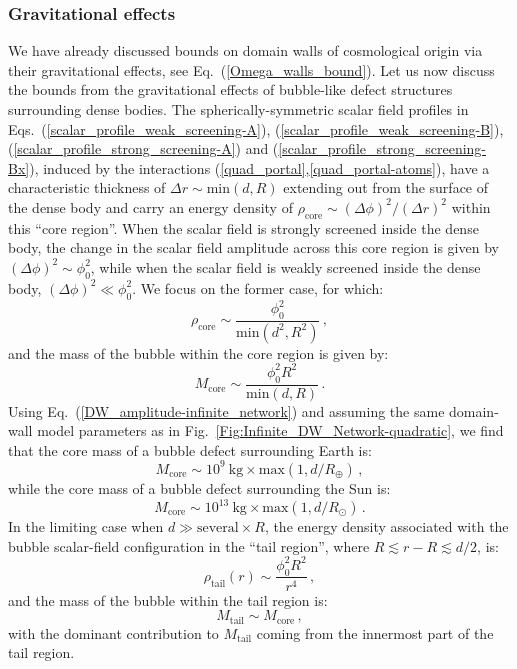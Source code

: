 \documentclass[aps,prd,onecolumn,nofootinbib]{revtex4-2} %
\begin{document}
\subsubsection{Gravitational effects}
\label{Sec:Main_Grav-effects}
We have already discussed bounds on domain walls of cosmological origin via their gravitational effects, see Eq.~(\ref{Omega_walls_bound}). 
Let us now discuss the bounds from the gravitational effects of bubble-like defect structures surrounding dense bodies. 
The spherically-symmetric scalar field profiles in Eqs.~(\ref{scalar_profile_weak_screening-A}), (\ref{scalar_profile_weak_screening-B}), (\ref{scalar_profile_strong_screening-A}) and (\ref{scalar_profile_strong_screening-Bx}), induced by the interactions (\ref{quad_portal},\ref{quad_portal-atoms}), have a characteristic thickness of $\Delta r \sim \textrm{min}(d,R)$ extending out from the surface of the dense body and carry an energy density of $\rho_\textrm{core} \sim (\Delta \phi)^2 / (\Delta r)^2$ within this ``core region''. 
When the scalar field is strongly screened inside the dense body, the change in the scalar field amplitude across this core region is given by $(\Delta \phi)^2 \sim \phi_0^2$, while when the scalar field is weakly screened inside the dense body, $(\Delta \phi)^2 \ll \phi_0^2$. 
We focus on the former case, for which: 
\begin{equation}
\label{energy-density_core}
\rho_\textrm{core} \sim \frac{\phi_0^2}{\textrm{min} (d^2 , R^2)}  \, , 
\end{equation}
and the mass of the bubble within the core region is given by: 
\begin{equation}
\label{mass_bubble_core}
M_\textrm{core} \sim \frac{\phi_0^2 R^2}{\textrm{min} (d , R)}  \, . 
\end{equation}
Using Eq.~(\ref{DW_amplitude-infinite_network}) and assuming the same domain-wall model parameters as in Fig.~\ref{Fig:Infinite_DW_Network-quadratic}, we find that the core mass of a bubble defect surrounding Earth is: 
\begin{equation}
\label{mass_bubble_core_Earth}
M_\textrm{core} \sim 10^9~\textrm{kg} \times \textrm{max} (1 , d/R_\oplus)  \, , 
\end{equation}
while the core mass of a bubble defect surrounding the Sun is: 
\begin{equation}
\label{mass_bubble_core_Sun}
M_\textrm{core} \sim 10^{13}~\textrm{kg} \times \textrm{max} (1 , d/R_\odot)  \, . 
\end{equation}
In the limiting case when $d \gg \textrm{several} \times R$, the energy density associated with the bubble scalar-field configuration in the ``tail region'', where $R \lesssim r - R \lesssim d/2$, is: 
\begin{equation}
\label{energy-density_tail}
\rho_\textrm{tail} (r) \sim \frac{\phi_0^2 R^2}{r^4}  \, , 
\end{equation}
and the mass of the bubble within the tail region is: 
\begin{equation}
\label{mass_bubble_tail}
M_\textrm{tail} \sim M_\textrm{core}  \, , 
\end{equation}
with the dominant contribution to $M_\textrm{tail}$ coming from the innermost part of the tail region. 
\end{document}
